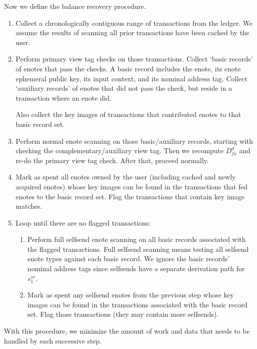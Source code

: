 Now we define the balance recovery procedure.
\begin{enumerate}
    \item Collect a chronologically contiguous range of transactions from the ledger. We assume the results of scanning all prior transactions have been cached by the user.

    \item Perform primary view tag checks on those transactions. Collect `basic records' of enotes that pass the checks. A basic record includes the enote, its enote ephemeral public key, its input context, and its nominal address tag. Collect `auxiliary records' of enotes that did not pass the check, but reside in a transaction where an enote did.

    Also collect the key images of transactions that contributed enotes to that basic record set.

    \item Perform normal enote scanning on those basic/auxiliary records, starting with checking the complementary/auxiliary view tag. Then we recompute $D^d_{fa}$ and re-do the primary view tag check. After that, proceed normally.

    \item Mark as spent all enotes owned by the user (including cached and newly acquired enotes) whose key images can be found in the transactions that fed enotes to the basic record set. Flag the transactions that contain key image matches.

    \item Loop until there are no flagged transactions:
    \begin{enumerate}
        \item Perform full selfsend enote scanning on all basic records associated with the flagged transactions. Full selfsend scanning means testing all selfsend enote types against each basic record. We ignore the basic records' nominal address tags since selfsends have a separate derivation path for $s^{sr}_1$.
        \item Mark as spent any selfsend enotes from the previous step whose key images can be found in the transactions associated with the basic record set. Flag those transactions (they may contain more selfsends).
    \end{enumerate}
\end{enumerate}

With this procedure, we minimize the amount of work and data that needs to be handled by each successive step.


